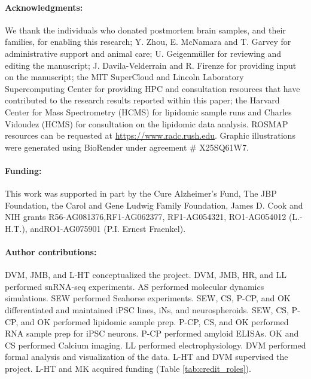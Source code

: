 \paragraph{Acknowledgments:} We thank the individuals who donated postmortem brain samples, and their families, for enabling this research; Y. Zhou, E. McNamara and T. Garvey for administrative support and animal care; U. Geigenmüller for reviewing and editing the manuscript; J. Davila-Velderrain and R. Firenze for providing input on the manuscript; the MIT SuperCloud and Lincoln Laboratory Supercomputing Center for providing HPC and consultation resources that have contributed to the research results reported within this paper; the Harvard Center for Mass Spectrometry (HCMS) for lipidomic sample runs and Charles Vidoudez (HCMS) for consultation on the lipidomic data analysis. ROSMAP resources can be requested at \url{https://www.radc.rush.edu}. Graphic illustrations were generated using BioRender under agreement # X25SQ61W7.

\paragraph{Funding:} This work was supported in part by the Cure Alzheimer’s Fund, The JBP Foundation, the Carol and Gene Ludwig Family Foundation, James D. Cook and NIH grants R56-AG081376,RF1-AG062377, RF1-AG054321, RO1-AG054012 (L.-H.T.), andRO1-AG075901 (P.I. Ernest Fraenkel).

\paragraph{Author contributions:} DVM, JMB, and L-HT conceptualized the project. DVM, JMB, HR, and LL performed snRNA-seq experiments. AS performed molecular dynamics simulations. SEW performed Seahorse experiments. SEW, CS, P-CP, and OK differentiated and maintained iPSC lines, iNs, and neurospheroids. SEW, CS, P-CP, and OK performed lipidomic sample prep. P-CP, CS, and OK performed RNA sample prep for iPSC neurons. P-CP performed amyloid ELISAs. OK and CS performed Calcium imaging. LL performed electrophysiology. DVM performed formal analysis and visualization of the data. L-HT and DVM supervised the project. L-HT and MK acquired funding (Table \ref{tab:credit_roles}).


